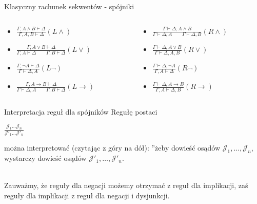 \documentclass{beamer}
\begin{document}
\begin{frame}{Klasyczny rachunek sekwentów - spójniki}
\begin{columns}
\begin{column}{0.6\textwidth}
\begin{itemize}
	\setlength\itemsep{2em}
	\item $\displaystyle \frac{\Gamma, A \land B \vdash \Delta}{\Gamma, A, B \vdash \Delta} (L\land)$
	\item $\displaystyle \frac{\Gamma, A \lor B \vdash \Delta}{\Gamma, A \vdash \Delta \qquad \Gamma, B \vdash \Delta} (L\lor)$
	\item $\displaystyle \frac{\Gamma, \lnot A \vdash \Delta}{\Gamma \vdash \Delta, A} (L\lnot)$
	\item $\displaystyle \frac{\Gamma, A \rightarrow B \vdash \Delta}{\Gamma \vdash \Delta, A \qquad \Gamma, B \vdash \Delta} (L\rightarrow)$
\end{itemize}
\end{column}
\begin{column}{0.5\textwidth}
\begin{itemize}
	\setlength\itemsep{2em}
	\item $\displaystyle \frac{\Gamma \vdash \Delta, A \land B}{\Gamma \vdash \Delta, A \qquad \Gamma \vdash \Delta, B} (R\land)$
	\item $\displaystyle \frac{\Gamma \vdash \Delta, A \lor B}{\Gamma \vdash \Delta, A, B} (R\lor)$
	\item $\displaystyle \frac{\Gamma \vdash \Delta, \lnot A}{\Gamma, A \vdash \Delta} (R\lnot)$
	\item $\displaystyle \frac{\Gamma \vdash \Delta, A \rightarrow B}{\Gamma, A \vdash \Delta, B} (R\rightarrow)$
\end{itemize}
\end{column}
\end{columns}
\end{frame}

\begin{frame}{Interpretacja reguł dla spójników}
	Regułę postaci \\
	
	\begin{center}
		$\displaystyle \frac{\mathcal{J}_1 \dots \mathcal{J}_n}{\mathcal{J}'_1 \dots \mathcal{J}'_n}$
	\end{center}
	
	można interpretować (czytając z góry na dół): ''żeby dowieść osądów $\mathcal{J}_1, \dots, \mathcal{J}_n$, wystarczy dowieść osądów $\mathcal{J}'_1, \dots, \mathcal{J}'_n$. \\~\
	
	Zauważmy, że reguły dla negacji możemy otrzymać z reguł dla implikacji, zaś reguły dla implikacji z reguł dla negacji i dysjunkcji.
\end{frame}
\end{document}
